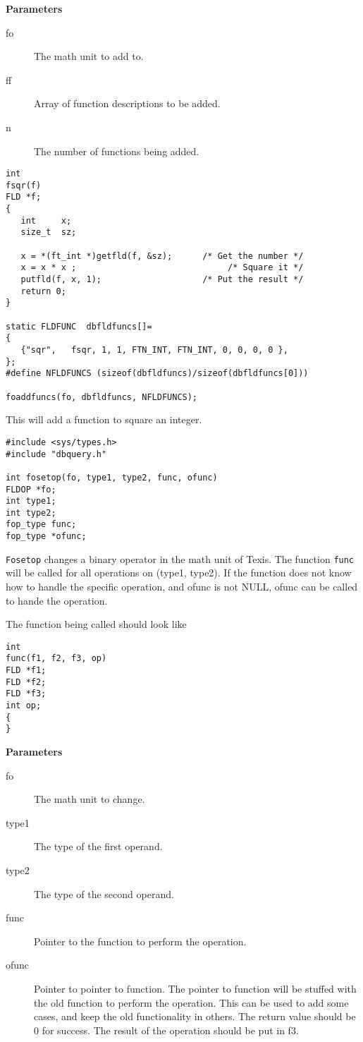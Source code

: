 {\bf Parameters}
\begin{description}
\item[fo] The math unit to add to.
\item[ff] Array of function descriptions to be added.
\item[n] The number of functions being added.
\end{description}

\EXAMPLE
\begin{verbatim}
int
fsqr(f)
FLD *f;
{
   int     x;
   size_t  sz;

   x = *(ft_int *)getfld(f, &sz);      /* Get the number */
   x = x * x ;                              /* Square it */
   putfld(f, x, 1);                    /* Put the result */
   return 0;
}

static FLDFUNC  dbfldfuncs[]=
{
   {"sqr",   fsqr, 1, 1, FTN_INT, FTN_INT, 0, 0, 0, 0 },
};
#define NFLDFUNCS (sizeof(dbfldfuncs)/sizeof(dbfldfuncs[0]))

foaddfuncs(fo, dbfldfuncs, NFLDFUNCS);
\end{verbatim}

This will add a function to square an integer.


\SYNOPSIS
\begin{verbatim}
#include <sys/types.h>
#include "dbquery.h"

int fosetop(fo, type1, type2, func, ofunc)
FLDOP *fo;
int type1;
int type2;
fop_type func;
fop_type *ofunc;
\end{verbatim}

\DESCRIPTION

{\tt Fosetop} changes a binary operator in the math unit of Texis.  The
function {\tt func} will be called for all operations on (type1, type2). If
the function does not know how to handle the specific operation, and ofunc
is not NULL, ofunc can be called to hande the operation.

The function being called should look like
\begin{verbatim}
int
func(f1, f2, f3, op)
FLD *f1;
FLD *f2;
FLD *f3;
int op;
{
}
\end{verbatim}

{\bf Parameters}
\begin{description}
\item[fo] The math unit to change.
\item[type1] The type of the first operand.
\item[type2] The type of the second operand.
\item[func] Pointer to the function to perform the operation.
\item[ofunc] Pointer to pointer to function.  The pointer to function will
be stuffed with the old function to perform the operation.  This can be
used to add some cases, and keep the old functionality in others.  The
return value should be 0 for success.  The result of the operation should
be put in f3.

\end{description}

